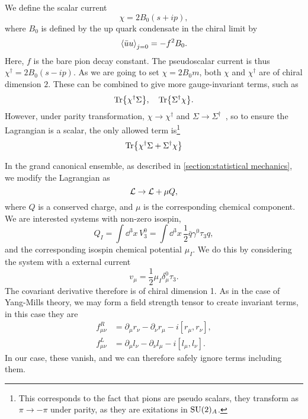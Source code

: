 We define the scalar current
\begin{equation}
    \chi = 2 B_0 (s + ip),
\end{equation}
where $B_0$ is defined by the up quark condensate in the chiral limit by
\begin{equation}
    \ex{\bar u u}_{j = 0} = - f^2 B_0.
\end{equation}
Here, $f$ is the bare pion decay constant.
The pseudoscalar current is thus $\chi^\dagger = 2 B_0 (s - ip)$.
As we are going to set $\chi = 2 B_0 m$, both $\chi$ and $\chi^\dagger$ are of chiral dimension $2$.
These can be combined to give more gauge-invariant terms, such as
\begin{equation}
    \Tr{\chi^\dagger \Sigma}, \quad \Tr{\Sigma^\dagger \chi}.
\end{equation}
However, under parity transformation, $\chi \rightarrow \chi^\dagger$ and $\Sigma \rightarrow \Sigma^\dagger$~\cite{Scherer2002IntroductionTC}, so to ensure the Lagrangian is a scalar, the only allowed term is\footnote{This corresponds to the fact that pions are pseudo scalars, they transform as $\pi \rightarrow - \pi$ under parity, as they are exitations in $\mathrm{SU}(2)_A$.}
\begin{equation}
    \label{leading order chi sigma term}
    \Tr{\chi^\dagger \Sigma + \Sigma^\dagger \chi}
\end{equation}

In the grand canonical ensemble, as described in \cref{section:statistical mechanics}, we modify the Lagrangian as
\begin{equation}
    \mathcal{L} \rightarrow \mathcal{L} + \mu Q,
\end{equation}
where $Q$ is a conserved charge, and $\mu$ is the corresponding chemical component.
We are interested systems with non-zero isospin, 
\begin{equation}
    Q_I = \int \dd^3 x \, V^0_3 = \int \dd^3 x \, \frac{1}{2}  \bar q \gamma^0 \tau_3 q,
\end{equation}
and the corresponding isospin chemical potential $\mu_I$.
We do this by considering the system with a external current
\begin{equation}
    v_\mu = \frac{1}{2} \mu_I \delta_\mu^0 \tau_3.
\end{equation}
The covariant derivative therefore is of chiral dimension 1.
As in the case of Yang-Mills theory, we may form a field strength tensor to create invariant terms, in this case they are
\begin{align}
    f_{\mu\nu}^R &= \partial_\mu r_\nu - \partial_\nu r_\mu - i [r_\mu, r_\nu], \\
    f_{\mu\nu}^L &= \partial_\mu l_\nu - \partial_\nu l_\mu - i [l_\mu, l_\nu].
\end{align}
In our case, these vanish, and we can therefore safely ignore terms including them.

